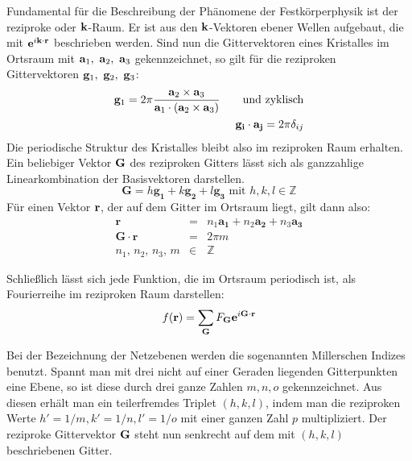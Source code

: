 Fundamental für die Beschreibung der Phänomene der Festkörperphysik ist der reziproke 
oder $\mathbf{k}$-Raum. Er ist aus den $\mathbf{k}$-Vektoren ebener Wellen aufgebaut, die mit 
$\mathbf{e}^{i \mathbf{k} \cdot \mathbf{r}}$ beschrieben werden. Sind nun 
die Gittervektoren eines Kristalles im Ortsraum mit $\mathbf{a}_1,\ \mathbf{a}_2,\ \mathbf{a}_3$ gekennzeichnet, 
so gilt für die reziproken Gittervektoren $\mathbf{g}_1,\ \mathbf{g}_2,\ \mathbf{g}_3$:
\begin{eqnarray}
    \mathbf{g}_1 = 2 \pi \frac{\mathbf{a}_2 \times \mathbf{a}_3 }
        {\mathbf{a}_1\cdot (\mathbf{a}_2 \times \mathbf{a}_3)} \qquad \mathrm{und \ zyklisch} \\
    \mathbf{g_i} \cdot \mathbf{a_j} = 2 \pi \delta_{ij}
\end{eqnarray}
Die periodische Struktur des Kristalles bleibt also im reziproken Raum erhalten.
Ein beliebiger Vektor $\mathbf{G}$ des reziproken Gitters lässt sich als ganzzahlige Linearkombination 
der Basisvektoren darstellen.
\begin{equation}
    \mathbf{G} = h \mathbf{g_1} + k \mathbf{g_2} + l \mathbf{g_3} \mbox{ mit }h,k,l \in \mathbb{Z}
\end{equation}
Für einen Vektor $\mathbf{r}$, der auf dem Gitter im Ortsraum liegt, gilt dann also:
\begin{eqnarray}
    \mathbf{r} &=& n_1 \mathbf{a_1} + n_2 \mathbf{a_2} + n_3 \mathbf{a_3} \\
    \mathbf{G} \cdot \mathbf{r}&=& 2 \pi m  \\
    n_1, \, n_2, \, n_3, \, m &\in& \mathbb{Z}
\end{eqnarray}

Schließlich lässt sich jede Funktion, die im Ortsraum periodisch ist, als 
Fourierreihe im reziproken Raum darstellen:
\begin{equation}
    f(\mathbf{r}) = \sum_{\mathbf{G}} F_{\mathbf{G}} \mathbf{e}^{i \mathbf{G} \cdot \mathbf{r}}
\end{equation}

Bei der Bezeichnung der Netzebenen werden die sogenannten Millerschen Indizes benutzt. 
Spannt man mit drei nicht auf einer Geraden liegenden Gitterpunkten eine Ebene, so ist 
diese durch 
drei ganze Zahlen $m, n, o$ gekennzeichnet. Aus diesen erhält man ein teilerfremdes 
Triplet $(h, k, l)$, indem man die reziproken Werte $h' = 1/m, k' = 1/n, l' = 1/o$ mit 
einer ganzen Zahl $p$ multipliziert. Der reziproke 
Gittervektor $\mathbf{G}$ steht nun senkrecht auf dem mit $(h, k, l)$ beschriebenen Gitter.
\cite{ibach2009festkorperphysik}





